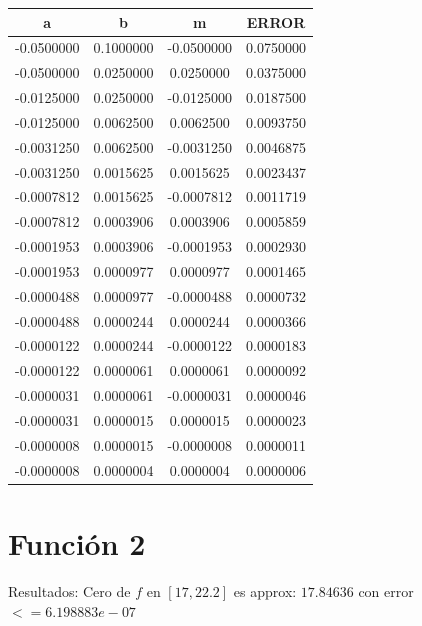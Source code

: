 \documentclass[12pt,a4paper]{article}
\begin{document}
\begin{tabular}{| c | c | c | c |}
\hline
a & b & m & ERROR \\ \hline
-0.0500000   &    0.1000000   &   -0.0500000    &   0.0750000      \\
-0.0500000   &    0.0250000   &    0.0250000    &   0.0375000      \\
-0.0125000   &    0.0250000   &   -0.0125000    &   0.0187500      \\
-0.0125000   &    0.0062500   &    0.0062500    &   0.0093750      \\
-0.0031250   &    0.0062500   &   -0.0031250    &   0.0046875      \\
-0.0031250   &    0.0015625   &    0.0015625    &   0.0023437      \\
-0.0007812   &    0.0015625   &   -0.0007812    &   0.0011719      \\
-0.0007812   &    0.0003906   &    0.0003906    &   0.0005859      \\
-0.0001953   &    0.0003906   &   -0.0001953    &   0.0002930      \\
-0.0001953   &    0.0000977   &    0.0000977    &   0.0001465      \\
-0.0000488   &    0.0000977   &   -0.0000488    &   0.0000732      \\
-0.0000488   &    0.0000244   &    0.0000244    &   0.0000366      \\
-0.0000122   &    0.0000244   &   -0.0000122    &   0.0000183      \\
-0.0000122   &    0.0000061   &    0.0000061    &   0.0000092      \\
-0.0000031   &    0.0000061   &   -0.0000031    &   0.0000046      \\
-0.0000031   &    0.0000015   &    0.0000015    &   0.0000023      \\
-0.0000008   &    0.0000015   &   -0.0000008    &   0.0000011      \\
-0.0000008   &    0.0000004   &    0.0000004    &   0.0000006      \\ \hline
\end{tabular}
\newpage
\section{Función 2}\label{sec:FUN2}

Resultados:  Cero de $f$ en $[ 17 , 22.2 ]$ es approx:  $17.84636$ con error $<= 6.198883e-07 $
\end{document}
